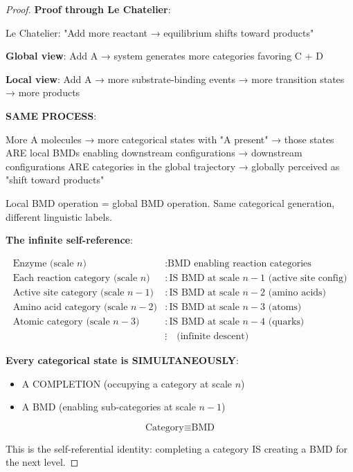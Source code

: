 \documentclass[12pt,a4paper]{article}
\begin{document}
\begin{proof}
\textbf{Proof through Le Chatelier}:

Le Chatelier: "Add more reactant → equilibrium shifts toward products"

\textbf{Global view}: Add A → system generates more categories favoring C + D

\textbf{Local view}: Add A → more substrate-binding events → more transition states → more products

\textbf{SAME PROCESS}:

More A molecules → more categorical states with "A present" → those states ARE local BMDs enabling downstream configurations → downstream configurations ARE categories in the global trajectory → globally perceived as "shift toward products"

Local BMD operation = global BMD operation. Same categorical generation, different linguistic labels.

\textbf{The infinite self-reference}:

\begin{align}
\text{Enzyme (scale } n\text{)} &: \text{BMD enabling reaction categories} \\
\text{Each reaction category (scale } n\text{)} &: \text{IS BMD at scale } n-1 \text{ (active site config)} \\
\text{Active site category (scale } n-1\text{)} &: \text{IS BMD at scale } n-2 \text{ (amino acids)} \\
\text{Amino acid category (scale } n-2\text{)} &: \text{IS BMD at scale } n-3 \text{ (atoms)} \\
\text{Atomic category (scale } n-3\text{)} &: \text{IS BMD at scale } n-4 \text{ (quarks)} \\
&\vdots \quad \text{(infinite descent)}
\end{align}

\textbf{Every categorical state is SIMULTANEOUSLY}:
\begin{itemize}
\item A COMPLETION (occupying a category at scale $n$)
\item A BMD (enabling sub-categories at scale $n-1$)
\end{itemize}

\begin{equation}
\boxed{\text{Category} \equiv \text{BMD}}
\end{equation}

This is the self-referential identity: completing a category IS creating a BMD for the next level.


\end{proof}
\end{document}
